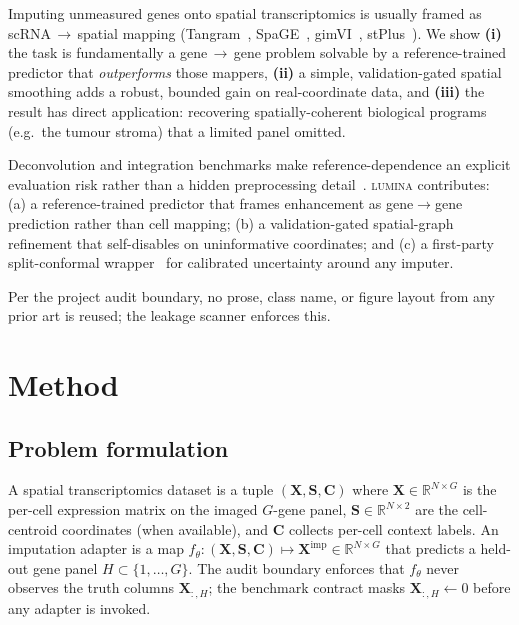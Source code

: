 \documentclass[10pt,letterpaper]{article}
\begin{document}
Imputing unmeasured genes onto spatial transcriptomics is usually framed as
scRNA\,$\to$\,spatial mapping (Tangram~\cite{Biancalani2021Tangram},
SpaGE~\cite{Abdelaal2020SpaGE},
gimVI~\cite{Lopez2019gimVI},
stPlus~\cite{Chen2021stPlus}).
We show \textbf{(i)} the task is fundamentally a gene\,$\to$\,gene problem solvable by
a reference-trained predictor that \emph{outperforms} those mappers,
\textbf{(ii)} a simple, validation-gated spatial smoothing adds a robust, bounded gain
on real-coordinate data, and
\textbf{(iii)} the result has direct application: recovering spatially-coherent
biological programs (e.g.\ the tumour stroma) that a limited panel omitted.

Deconvolution and integration benchmarks make reference-dependence an explicit evaluation
risk rather than a hidden preprocessing detail~\cite{Li2023DeconvolutionBenchmark,%
ClusteringIntegrationBenchmark2024}. \textsc{lumina} contributes: (a) a reference-trained
predictor that frames enhancement as gene$\to$gene prediction rather than cell mapping;
(b) a validation-gated spatial-graph refinement that self-disables on uninformative
coordinates; and (c) a first-party split-conformal
wrapper~\cite{Vovk2005Conformal,Romano2019Conformalized} for calibrated uncertainty
around any imputer.

Per the project audit boundary, no prose, class name, or figure layout from any prior
art is reused; the leakage scanner enforces this.

\section{Method}
\label{sec:method}

\subsection{Problem formulation}
\label{sec:problem-formulation}

A spatial transcriptomics dataset is a tuple $(\mathbf{X}, \mathbf{S}, \mathbf{C})$
where $\mathbf{X} \in \mathbb{R}^{N \times G}$ is the per-cell expression matrix on
the imaged $G$-gene panel, $\mathbf{S} \in \mathbb{R}^{N \times 2}$ are the
cell-centroid coordinates (when available), and $\mathbf{C}$ collects per-cell context
labels. An imputation adapter is a map
$f_\theta\!:\!(\mathbf{X}, \mathbf{S}, \mathbf{C}) \mapsto
\mathbf{X}^{\text{imp}} \in \mathbb{R}^{N \times G}$
that predicts a held-out gene panel $H \subset \{1,\ldots,G\}$.
The audit boundary enforces that $f_\theta$ never observes the truth columns
$\mathbf{X}_{:,H}$; the benchmark contract masks $\mathbf{X}_{:,H} \leftarrow 0$
before any adapter is invoked.
\end{document}
